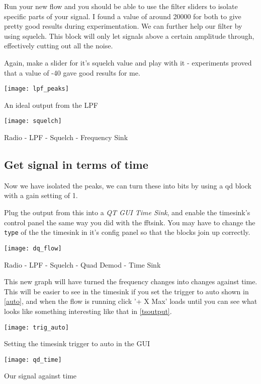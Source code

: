 Run your new flow and you should be able to use the filter sliders to isolate specific parts of your signal. I found a value of around 20000 for both to give pretty good results during experimentation. We can further help our filter by using \gls{squelch}. This block will only let signals above a certain amplitude through, effectively cutting out all the noise. 


Again, make a slider for it's \gls{squelch} value and play with it - experiments proved that a value of -40 gave good results for me.

\centrefigurestart
\texttt{[image: lpf\_peaks]}
\caption{An ideal output from the LPF}
\centrefigureend


\centrefigurestart
\texttt{[image: squelch]}
\caption{Radio - LPF - Squelch - Frequency Sink}
\centrefigureend

\subsection{Get signal in terms of time}
Now we have isolated the peaks, we can turn these into bits by using a \Gls{qd} block with a gain setting of 1.


Plug the output from this into a \textit{QT GUI Time Sink}, and enable the \gls{timesink}'s control panel the same way you did with the \gls{fftsink}. You may have to change the \verb|type| of the the \gls{timesink} in it's config panel so that the blocks join up correctly.

\centrefigurestart
\texttt{[image: dq\_flow]}
\caption{Radio - LPF - Squelch - Quad Demod - Time Sink}
\centrefigureend

This new graph will have turned the frequency changes into changes against time. This will be easier to see in the \gls{timesink} if you set the trigger to auto shown in \cref{auto}, and when the flow is running click '+ X Max' loads until you can see what looks like something interesting like that in \cref{tsoutput}.

\centrefigurestart
\texttt{[image: trig\_auto]}
\caption{Setting the timesink trigger to auto in the GUI}
\label{auto}
\centrefigureend

\centrefigurestart
\texttt{[image: qd\_time]}
\caption{Our signal against time}
\label{tsoutput}
\centrefigureend


